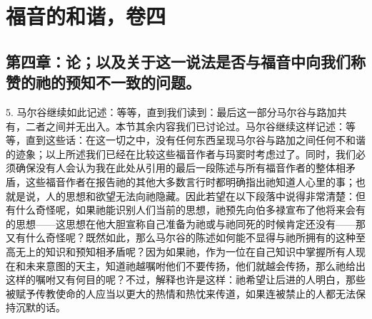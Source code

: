 \section{福音的和谐，卷四}


\subsection{第四章：论；以及关于这一说法是否与福音中向我们称赞的祂的预知不一致的问题。}

5. 马尔谷继续如此记述：等等，直到我们读到：最后这一部分马尔谷与路加共有，二者之间并无出入。本节其余内容我们已讨论过。马尔谷继续这样记述：等等，直到这些话：在这一切之中，没有任何东西呈现马尔谷与路加之间任何不和谐的迹象；以上所述我们已经在比较这些福音作者与玛窦时考虑过了。同时，我们必须确保没有人会认为我在此处从引用的最后一段陈述与所有福音作者的整体相矛盾，这些福音作者在报告祂的其他大多数言行时都明确指出祂知道人心里的事；也就是说，人的思想和欲望无法向祂隐藏。因此若望在以下段落中说得非常清楚：但有什么奇怪呢，如果祂能识别人们当前的思想，祂预先向伯多禄宣布了他将来会有的思想——这思想在他大胆宣称自己准备为祂或与祂同死的时候肯定还没有——那又有什么奇怪呢？既然如此，那么马尔谷的陈述如何能不显得与祂所拥有的这种至高无上的知识和预知相矛盾呢？因为如果祂，作为一位在自己知识中掌握所有人现在和未来意图的天主，知道祂越嘱咐他们不要传扬，他们就越会传扬，那么祂给出这样的嘱咐又有何目的呢？不过，解释也许是这样：祂希望让后进的人明白，那些被赋予传教使命的人应当以更大的热情和热忱来传道，如果连被禁止的人都无法保持沉默的话。\par



